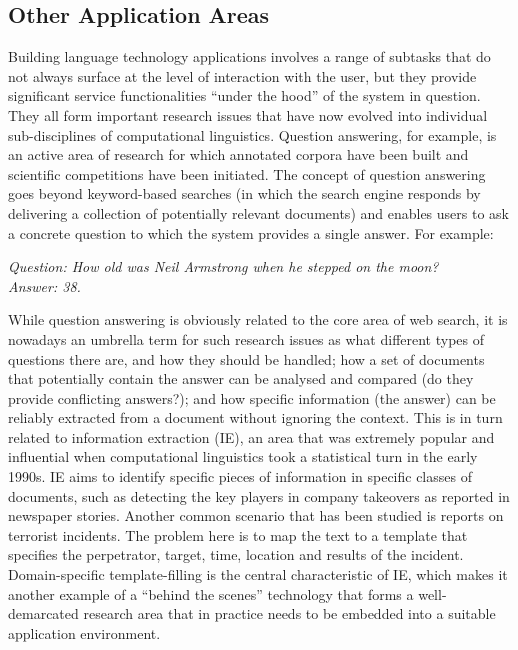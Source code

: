 \documentclass[]{../metanetpaper}
\begin{document}
	\subsection{Other Application Areas}
Building language technology applications involves a range of subtasks that do not always surface at the level of interaction with the user, but they provide significant service functionalities “under the hood” of the system in question. They all form important research issues that have now evolved into individual sub-disciplines of computational linguistics. 
Question answering, for example, is an active area of research for which annotated corpora have been built and scientific competitions have been initiated. The concept of question answering goes beyond keyword-based searches (in which the search engine responds by delivering a collection of potentially relevant documents) and enables users to ask a concrete question to which the system provides a single answer. For example: 
\begin{center}
\textit{Question: How old was Neil Armstrong when he stepped on the moon?\\
Answer: 38.}
\end{center}
While question answering is obviously related to the core area of web search, it is nowadays an umbrella term for such research issues as what different types of questions there are, and how they should be handled; how a set of documents that potentially contain the answer can be analysed and compared (do they provide conflicting answers?); and how specific information (the answer) can be reliably extracted from a document without ignoring the context. 
This is in turn related to information extraction (IE), an area that was extremely popular and influential when computational linguistics took a statistical turn in the early 1990s. IE aims to identify specific pieces of information in specific classes of documents, such as detecting the key players in company takeovers as reported in newspaper stories. Another common scenario that has been studied is reports on terrorist incidents. The problem here is to map the text to a template that specifies the perpetrator, target, time, location and results of the incident. Domain-specific template-filling is the central characteristic of IE, which makes it another example of a “behind the scenes” technology that forms a well-demarcated research area that in practice needs to be embedded into a suitable application environment. 
\end{document}
